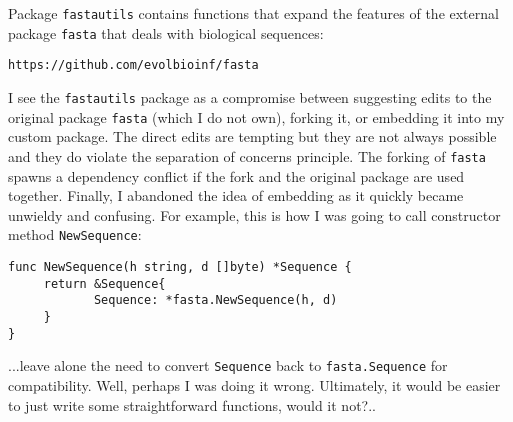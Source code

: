 Package \texttt{fastautils} contains functions that expand the
features of the external package \texttt{fasta} that deals with
biological sequences:
\begin{verbatim}
https://github.com/evolbioinf/fasta
\end{verbatim}
I see the \texttt{fastautils} package as a compromise between
suggesting edits to the original package \texttt{fasta} (which I do
not own), forking it, or embedding it into my custom package. The
direct edits are tempting but they are not always possible and they do
violate the separation of concerns principle. The forking
of \texttt{fasta} spawns a dependency conflict if the fork and the
original package are used together. Finally, I abandoned the idea of
embedding as it quickly became unwieldy and confusing. For example,
this is how I was going to call constructor
method \texttt{NewSequence}:
\begin{verbatim}
func NewSequence(h string, d []byte) *Sequence {
     return &Sequence{
            Sequence: *fasta.NewSequence(h, d)
     }
}
\end{verbatim}
...leave alone the need to convert \texttt{Sequence} back
to \texttt{fasta.Sequence} for compatibility.  Well, perhaps I was
doing it wrong. Ultimately, it would be easier to just write some
straightforward functions, would it not?..
